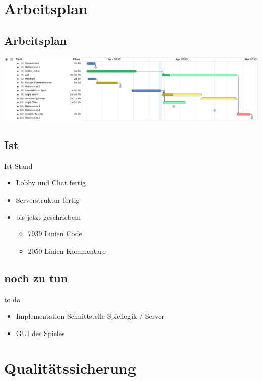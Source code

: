 \documentclass[12pt, utf8]{beamer}
\begin{document}
\section{Arbeitsplan}
\subsection{Arbeitsplan}
\begin{frame}
\centering
\includegraphics[scale=0.3]{images/CS108.pdf}
\end{frame}

\subsection{Ist}
\begin{frame}{Ist-Stand}
\begin{itemize}
\item Lobby und Chat fertig
\item Serverstruktur fertig %
\item bis jetzt geschrieben:
\begin{itemize}
\item 7939 Linien Code
\item 2050 Linien Kommentare
\end{itemize}

\end{itemize}
\end{frame}

\subsection{noch zu tun}
\begin{frame}{to do}
\begin{itemize}
\item Implementation Schnittstelle Spiellogik / Server
\item GUI des Spieles
\end{itemize}
\end{frame}

\section{Qualitätssicherung}
\end{document}
